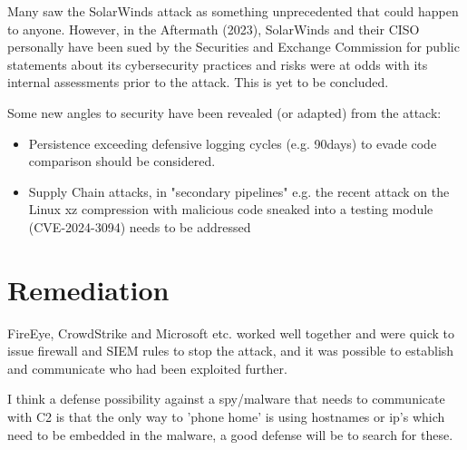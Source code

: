 \documentclass[
	letterpaper, %
	10pt, %
	unnumberedsections, %
	twoside, %
]{LTJournalArticle}
\begin{document}
Many saw the SolarWinds attack as something unprecedented that could happen to anyone. However, in the Aftermath (2023), SolarWinds and their CISO personally have been sued by the Securities and Exchange Commission\cite{SECLawsuit} for public statements about its cybersecurity practices and risks were at odds with its internal assessments prior to the attack. This is yet to be concluded.

Some new angles to security have been revealed (or adapted) from the attack:
\begin{itemize}
	\item Persistence exceeding defensive logging cycles (e.g. 90days) to evade code comparison should be considered.
	\item Supply Chain attacks, in "secondary pipelines" e.g. the recent attack on the Linux xz compression with malicious code sneaked into a testing module (CVE-2024-3094\cite{NISTCVE20243094}) needs to be addressed
\end{itemize}


\section{Remediation} 
FireEye, CrowdStrike and Microsoft etc. worked well together and were quick to issue firewall and SIEM rules to stop the attack, and it was possible to establish and communicate who had been exploited further. 

I think a defense possibility against a spy/malware that needs to communicate with C2 is that the only way to 'phone home' is using hostnames or ip's which need to be embedded in the malware, a good defense will be to search for these. 

\printbibliography %



\end{document}
